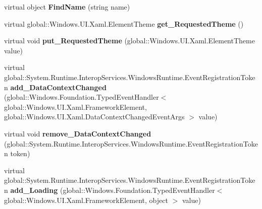 \begin{DoxyCompactItemize}
\item 
\mbox{\label{class_windows_1_1_u_i_1_1_xaml_1_1_framework_element_a6b612b2e8b522c30e02387f5aa3236a4}} 
virtual object {\bfseries Find\+Name} (string name)
\item 
\mbox{\label{class_windows_1_1_u_i_1_1_xaml_1_1_framework_element_a59026d5b9db13dbfef26e454cd2d1b90}} 
virtual global\+::\+Windows.\+U\+I.\+Xaml.\+Element\+Theme {\bfseries get\+\_\+\+Requested\+Theme} ()
\item 
\mbox{\label{class_windows_1_1_u_i_1_1_xaml_1_1_framework_element_a5e940cb28f70daaf9fd01a0e738290a2}} 
virtual void {\bfseries put\+\_\+\+Requested\+Theme} (global\+::\+Windows.\+U\+I.\+Xaml.\+Element\+Theme value)
\item 
\mbox{\label{class_windows_1_1_u_i_1_1_xaml_1_1_framework_element_a10e46700c2e4f78a1116716f792f6381}} 
virtual global\+::\+System.\+Runtime.\+Interop\+Services.\+Windows\+Runtime.\+Event\+Registration\+Token {\bfseries add\+\_\+\+Data\+Context\+Changed} (global\+::\+Windows.\+Foundation.\+Typed\+Event\+Handler$<$ global\+::\+Windows.\+U\+I.\+Xaml.\+Framework\+Element, global\+::\+Windows.\+U\+I.\+Xaml.\+Data\+Context\+Changed\+Event\+Args $>$ value)
\item 
\mbox{\label{class_windows_1_1_u_i_1_1_xaml_1_1_framework_element_aeb7ffc9376ba20a677d338c3c42ca767}} 
virtual void {\bfseries remove\+\_\+\+Data\+Context\+Changed} (global\+::\+System.\+Runtime.\+Interop\+Services.\+Windows\+Runtime.\+Event\+Registration\+Token token)
\item 
\mbox{\label{class_windows_1_1_u_i_1_1_xaml_1_1_framework_element_a98b5b4501ee2b393150f26b7ee822e88}} 
virtual global\+::\+System.\+Runtime.\+Interop\+Services.\+Windows\+Runtime.\+Event\+Registration\+Token {\bfseries add\+\_\+\+Loading} (global\+::\+Windows.\+Foundation.\+Typed\+Event\+Handler$<$ global\+::\+Windows.\+U\+I.\+Xaml.\+Framework\+Element, object $>$ value)
\item 

\end{DoxyCompactItemize}
